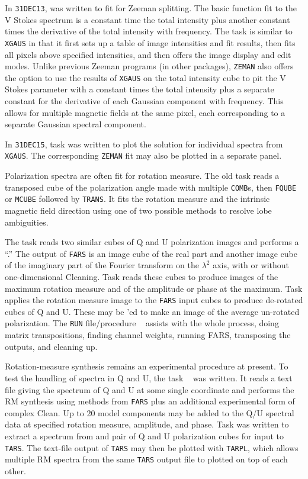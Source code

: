      In {\tt 31DEC13}, {\tt {}} was written to fit for
Zeeman splitting.  The basic function fit to the V Stokes spectrum is
a constant time the total intensity plus another constant times the
derivative of the total intensity with frequency.  The task is similar
to {\tt XGAUS} in that it first sets up a table of image intensities
and fit results, then fits all pixels above specified intensities, and
then offers the image display and edit modes.  Unlike previous Zeeman
programs (in other packages), {\tt ZEMAN} also offers the option to
use the results of {\tt XGAUS} on the total intensity cube to pit the
V Stokes parameter with a constant times the total intensity plus a
separate constant for the derivative of each Gaussian component with
frequency.  This allows for multiple magnetic fields at the same
pixel, each corresponding to a separate Gaussian spectral component.

     In {\tt 31DEC15}, task {\tt {}} was written to plot the
solution for individual spectra from {\tt XGAUS}\@.  The corresponding
{\tt ZEMAN} fit may also be plotted in a separate panel.

     Polarization spectra are often fit for rotation measure.  The
old task {\tt {}} reads a transposed cube of the polarization
angle made with multiple {\tt COMB}s, then {\tt FQUBE} or {\tt MCUBE}
followed by {\tt TRANS}.  It fits the rotation measure and the
intrinsic magnetic field direction using one of two possible methods
to resolve lobe ambiguities.

     The task {\tt {}} reads two similar cubes of Q and U
polarization images and performs a ``.''  The output of {\tt FARS} is an image cube of the real
part and another image cube of the imaginary part of the Fourier
transform on the $\lambda^2$ axis, with or without one-dimensional
Cleaning.  Task {\tt {}} reads these cubes to produce images
of the maximum rotation measure and of the amplitude or phase at the
maximum.  Task {\tt {}} applies the rotation measure image
to the {\tt FARS} input cubes to produce de-rotated cubes of Q and U.
These may be {\tt {}}'ed to make an image of the average
un-rotated polarization.  The {\tt RUN} file/procedure {\tt
{}} assists with the whole process, doing matrix
transpositions, finding channel weights, running FARS, transposing the
outputs, and cleaning up.

     Rotation-measure synthesis remains an experimental procedure at
present.  To test the handling of spectra in Q and U, the task {\tt
{}} was written.  It reads a text file giving the spectrum of
Q and U at some single coordinate and performs the RM synthesis using
methods from {\tt FARS} plus an additional experimental form of
complex Clean.  Up to 20 model components may be added to the Q/U
spectral data at specified rotation measure, amplitude, and phase.
Task {\tt {}} was written to extract a spectrum from and
pair of Q and U polarization cubes for input to {\tt TARS}\@.  The
text-file output of {\tt TARS} may then be plotted with {\tt TARPL},
which allows multiple RM spectra from the same {\tt TARS} output file
to plotted on top of each other.


